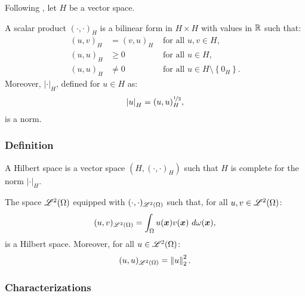 Following \cite[p.~131]{Brezis2010}, let $H$ be a vector space.

\begin{definition}
    A scalar product $\left( \cdot, \cdot \right)_H$ is a bilinear form in $H \times H$ with values in $\mathbb{R}$ such that:
    \begin{align}
        (u, v)_H & = (v, u)_H &\text{ for all } u, v \in H, \\
        (u, u)_H & \geq 0 &\text{ for all } u \in H, \\
        (u, u)_H & \neq 0 &\text{ for all } u \in H \setminus \left\{ 0_H \right\}.
    \end{align}
    Moreover, $\left\lvert \cdot \right\rvert_H$, defined for $u \in H$ as:
    \begin{align} %
        \left\lvert u \right\rvert_H = (u, u)_H^{\nicefrac12},
    \end{align}
    is a norm.
\end{definition}

\subsubsection{Definition}

\begin{definition} %
    A Hilbert space is a vector space $(H, (\cdot, \cdot)_H)$ such that $H$ is complete for the norm $\left\lvert \cdot \right\rvert_H$.
\end{definition}

\begin{remark}
    The space $\mathscr{L}^{2}(\Omega)$ equipped with $(\cdot, \cdot)_{\mathscr{L}^{2}(\Omega)}$ such that, for all $u, v \in \mathscr{L}^{2}(\Omega)$:
    \begin{align}
        (u, v)_{\mathscr{L}^{2}(\Omega)} = \int_{\Omega} u(\bm{x}) v(\bm{x}) ~ d \omega(\bm{x}),
    \end{align}
    is a Hilbert space. Moreover, for all $u \in \mathscr{L}^{2}(\Omega)$:
    \begin{align}
        (u, u)_{\mathscr{L}^{2}(\Omega)} = \left\lVert u \right\rVert_2^2.
    \end{align}
\end{remark}

\subsubsection{Characterizations}

